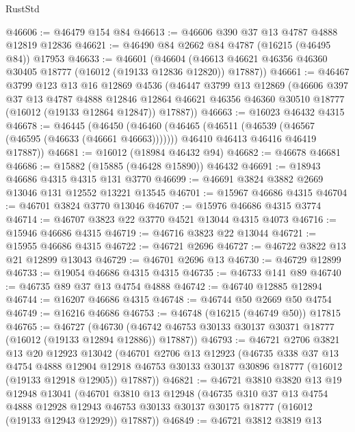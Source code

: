 \begin{lexlean}{RustStd}
\begin{coremodule}
@46606 := @46479 @154 @84
@46613 := @46606 @390 @37 @13 @4787 @4888 @12819 @12836
@46621 := @46490 @84 @2662 @84 @4787 (@16215 (@46495 @84)) @17953
@46633 := @46601
    (@46604 (@46613 @46621 @46356 @46360 @30405 @18777 (@16012 (@19133 @12836 @12820)) @17887))
@46661 := @46467
    @3799
    @123
    @13
    @16
    @12869
    @4536
    (@46447
      @3799
      @13
      @12869
      (@46606
        @397
        @37
        @13
        @4787
        @4888
        @12846
        @12864
        @46621
        @46356
        @46360
        @30510
        @18777
        (@16012 (@19133 @12864 @12847))
        @17887))
@46663 := @16023 @46432 @4315
@46678 := @46445
    (@46450
      (@46460
        (@46465 (@46511 (@46539 (@46567 (@46595 (@46633 (@46661 @46663)))))))
        @46410
        @46413
        @46416
        @46419
        @17887))
@46681 := @16012 (@18984 @46432 @94)
@46682 := @46678 @46681
@46686 := @15882 (@15885 (@46428 @15890)) @46432
@46691 := @18943 @46686 @4315 @4315 @131 @3770
@46699 := @46691 @3824 @3882 @2669 @13046 @131 @12552 @13221 @13545
@46701 := @15967 @46686 @4315
@46704 := @46701 @3824 @3770 @13046
@46707 := @15976 @46686 @4315 @3774
@46714 := @46707 @3823 @22 @3770 @4521 @13044 @4315 @4073
@46716 := @15946 @46686 @4315
@46719 := @46716 @3823 @22 @13044
@46721 := @15955 @46686 @4315
@46722 := @46721 @2696
@46727 := @46722 @3822 @13 @21 @12899 @13043
@46729 := @46701 @2696 @13
@46730 := @46729 @12899
@46733 := @19054 @46686 @4315 @4315
@46735 := @46733 @141 @89
@46740 := @46735 @89 @37 @13 @4754 @4888
@46742 := @46740 @12885 @12894
@46744 := @16207 @46686 @4315
@46748 := @46744 @50 @2669 @50 @4754
@46749 := @16216 @46686
@46753 := @46748 (@16215 (@46749 @50)) @17815
@46765 := @46727
    (@46730 (@46742 @46753 @30133 @30137 @30371 @18777 (@16012 (@19133 @12894 @12886)) @17887))
@46793 := @46721
    @2706
    @3821
    @13
    @20
    @12923
    @13042
    (@46701
      @2706
      @13
      @12923
      (@46735
        @338
        @37
        @13
        @4754
        @4888
        @12904
        @12918
        @46753
        @30133
        @30137
        @30896
        @18777
        (@16012 (@19133 @12918 @12905))
        @17887))
@46821 := @46721
    @3810
    @3820
    @13
    @19
    @12948
    @13041
    (@46701
      @3810
      @13
      @12948
      (@46735
        @310
        @37
        @13
        @4754
        @4888
        @12928
        @12943
        @46753
        @30133
        @30137
        @30175
        @18777
        (@16012 (@19133 @12943 @12929))
        @17887))
@46849 := @46721
    @3812
    @3819
    @13

\end{coremodule}
\end{lexlean}
